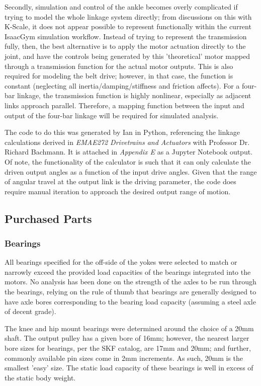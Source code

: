 \documentclass{article}
\begin{document}
Secondly, simulation and control of the ankle becomes overly complicated if trying to model the whole linkage system directly; from discussions on this with K-Scale, it does not appear possible to represent functionally within the current IsaacGym simulation workflow. Instead of trying to represent the transmission fully, then, the best alternative is to apply the motor actuation directly to the joint, and have the controls being generated by this 'theoretical' motor mapped through a transmission function for the actual motor outputs. This is also required for modeling the belt drive; however, in that case, the function is constant (neglecting all inertia/damping/stiffness and friction affects). For a four-bar linkage, the transmission function is highly nonlinear, especially as adjacent links approach parallel. Therefore, a mapping function between the input and output of the four-bar linkage will be required for simulated analysis. 

The code to do this was generated by Ian in Python, referencing the linkage calculations derived in \textit{EMAE272 Drivetrains and Actuators} with Professor Dr. Richard Bachmann. It is attached in \textit{Appendix E} as a Jupyter Notebook output. Of note, the functionality of the calculator is such that it can only calculate the driven output angles as a function of the input drive angles. Given that the range of angular travel at the output link is the driving parameter, the code does require manual iteration to approach the desired output range of motion. 

\subsection{Purchased Parts}

\subsubsection{Bearings}

All bearings specified for the off-side of the yokes were selected to match or narrowly exceed the provided load capacities of the bearings integrated into the motors. No analysis has been done on the strength of the axles to be run through the bearings, relying on the rule of thumb that bearings are generally designed to have axle bores corresponding to the bearing load capacity (assuming a steel axle of decent grade). 

The knee and hip mount bearings were determined around the choice of a 20mm shaft. The output pulley has a given bore of 16mm; however, the nearest larger bore sizes for bearings, per the SKF catalog, are 17mm and 20mm; and further, commonly available pin sizes come in 2mm increments. As such, 20mm is the smallest 'easy' size. The static load capacity of these bearings is well in excess of the static body weight.
\end{document}
